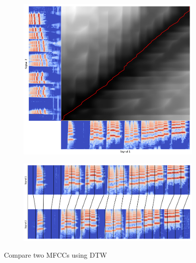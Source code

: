 \documentclass[%
  article,%
  10pt,%
  a4paper,%
  fleqn,%
  oneside,%
  sumario = tradicional,%
  chapter = TITLE,%
  section = TITLE,%
]{abntex2}
\begin{document}
\begin{figure}
\centering
\begin{minipage}[b]{.3\textwidth}
\begin{figure}[H]
  \centering
  \includegraphics[width = \columnwidth]{./Figuras/dtwmfcc}
\end{figure}
\end{minipage}\qquad
\begin{minipage}[b]{.6\textwidth}
\begin{figure}[H]
  \centering
  \includegraphics[width = \columnwidth]{./Figuras/mfccdtw2}
\end{figure}
\end{minipage}
\caption[css]{Compare two MFCCs using DTW\footnotemark}
\label{fig:dtwmfcc}
\end{figure}
\end{document}
